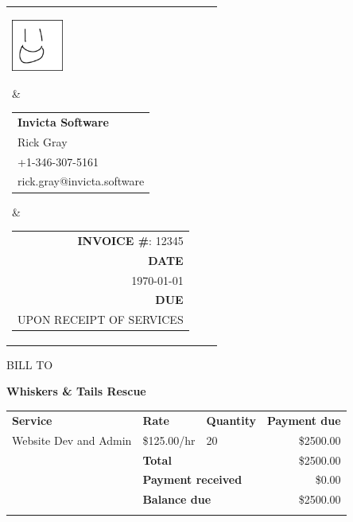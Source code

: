 \documentclass{letter}
\begin{document}
\begin{tabularx}{\textwidth}{@{} l X r @{}}
    \parbox[t]{1.7cm}{\vspace{-9pt}\includegraphics[height=1.7cm]{logo.png}}
    &

    \begin{tabular}[t]{@{}l@{}}
        \textbf{Invicta Software} \\
        Rick Gray                 \\
        +1-346-307-5161           \\
        rick.gray@invicta.software
    \end{tabular}
    &

    \begin{tabular}[t]{@{}r@{}}
                 \footnotesize \textbf{INVOICE \#}: 12345 \\
        [-0.6ex] \footnotesize \textbf{DATE}              \\
        [-0.6ex] \footnotesize \MakeUppercase{\today}     \\
        [-0.6ex] \footnotesize \textbf{DUE}               \\
        [-0.6ex] \footnotesize UPON RECEIPT OF SERVICES
    \end{tabular}
\end{tabularx}

\vspace{1cm}

BILL TO

\Large\textbf{Whiskers \& Tails Rescue}\normalsize

\begin{tabularx}{\linewidth}{p{8.5cm} X X r}
    \hhline{----}
    \rule{0pt}{5ex} \bf{Service}          & \bf{Rate}                                & \bf{Quantity} & \bf Payment due \\
    \hhline{----}
    \rule{0pt}{5ex} Website Dev and Admin & \$125.00/hr                              & 20            & \$2500.00       \\
    \hhline{----}
    \rule{0pt}{5ex}                       & \multicolumn{2}{l}{\bf Total}                            & \$2500.00       \\
    \hhline{~---}
    \rule{0pt}{5ex}                       & \multicolumn{2}{l}{\bf Payment received}                 & \$0.00          \\
    \hhline{~---}
    \rule{0pt}{5ex}                       & \multicolumn{2}{l}{\bf Balance due}                      & \$2500.00       \\
    \hhline{~===}
\end{tabularx}
\end{document}
